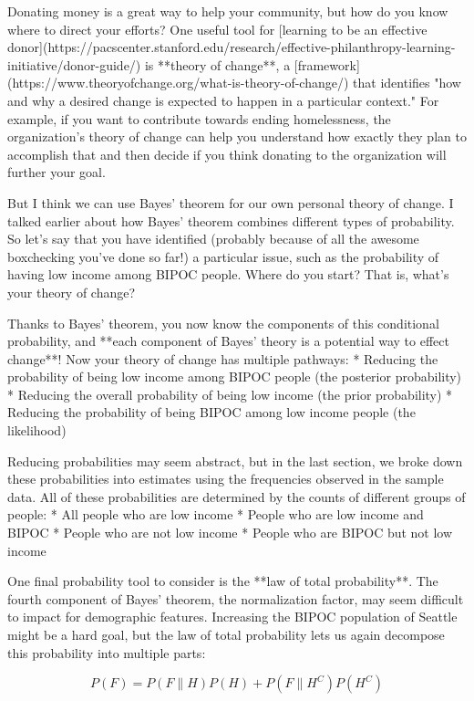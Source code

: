 \documentclass[12pt]{article}
\begin{document}
Donating money is a great way to help your community, but how do you know where to direct your efforts? One useful tool for [learning to be an effective donor](https://pacscenter.stanford.edu/research/effective-philanthropy-learning-initiative/donor-guide/) is **theory of change**, a [framework](https://www.theoryofchange.org/what-is-theory-of-change/) that identifies "how and why a desired change is expected to happen in a particular context." For example, if you want to contribute towards ending homelessness, the organization's theory of change can help you understand how exactly they plan to accomplish that and then decide if you think donating to the organization will further your goal.

But I think we can use Bayes' theorem for our own personal theory of change. I talked earlier about how Bayes' theorem combines different types of probability. So let's say that you have identified (probably because of all the awesome boxchecking you've done so far!) a particular issue, such as the probability of having low income among BIPOC people. Where do you start? That is, what's your theory of change?

Thanks to Bayes' theorem, you now know the components of this conditional probability, and **each component of Bayes' theory is a potential way to effect change**! Now your theory of change has multiple pathways:
* Reducing the probability of being low income among BIPOC people (the posterior probability)
* Reducing the overall probability of being low income (the prior probability)
* Reducing the probability of being BIPOC among low income people (the likelihood)

Reducing probabilities may seem abstract, but in the last section, we broke down these probabilities into estimates using the frequencies observed in the sample data. All of these probabilities are determined by the counts of different groups of people:
* All people who are low income
* People who are low income and BIPOC
* People who are not low income
* People who are BIPOC but not low income

One final probability tool to consider is the **law of total probability**. The fourth component of Bayes' theorem, the normalization factor, may seem difficult to impact for demographic features. Increasing the BIPOC population of Seattle might be a hard goal, but the law of total probability lets us again decompose this probability into multiple parts:

$$P(F) = P(F \| H) P(H) + P(F \| H^C) P(H^C)$$
\end{document}
